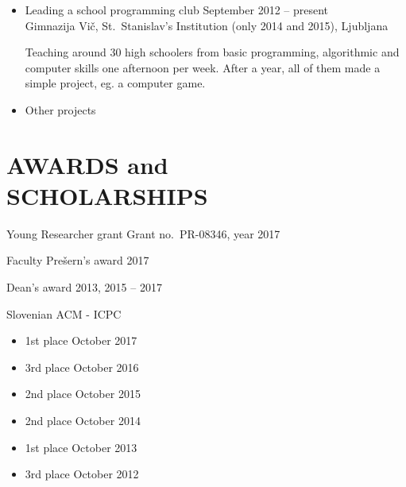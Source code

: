 \documentclass[line,margin]{res}
\newcommand{\wmeta}[1]{\sf#1\rm}
\newcommand{\wdesc}[1]{

#1

\vspace{6pt}}
\newenvironment{itemize*}{\vspace{-2.5\parskip}\begin{itemize}\setlength{\itemsep}{0pt}\setlength{\parskip}{2pt}}{\end{itemize}\vspace{-1\parskip}}
\begin{document}
\begin{itemize}
{    Ljubljana's highway lighting system.}
  \item \wmeta{Leading a school programming club \hfill September 2012 -- present \\
    \hspace*{\fill} Gimnazija Vič, St.\ Stanislav's Institution (only 2014 and 2015), Ljubljana}
  \wdesc{Teaching around 30 high schoolers from basic programming, algorithmic
    and computer skills one afternoon per week. After a year, all of them made a
    simple project, eg. a computer game.}
  \item \wmeta{Other projects}
\end{itemize}

\section{AWARDS and \\ SCHOLARSHIPS}

\wmeta{Young Researcher grant} \hfill Grant no.\ PR-08346, year 2017

\wmeta{Faculty Prešern's award} \hfill 2017

\wmeta{Dean's award} \hfill 2013, 2015 -- 2017

\wmeta{Slovenian ACM - ICPC}
\begin{itemize}
  \item 1st place \hfill October 2017
  \item 3rd place \hfill October 2016
  \item 2nd place \hfill October 2015
  \item 2nd place \hfill October 2014
  \item 1st place \hfill October 2013
  \item 3rd place \hfill October 2012
\end{itemize}
\end{document}
